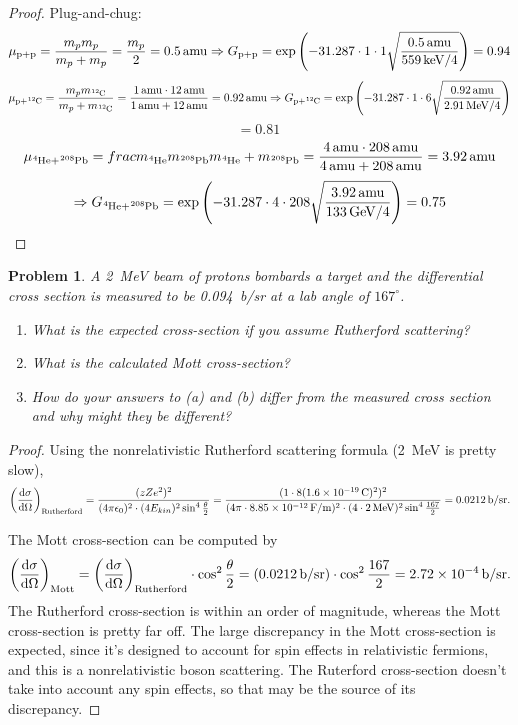 \documentclass{article}
\newtheorem{plm}{Problem}
\begin{document}
\begin{proof}
  Plug-and-chug:
  \[
    \mu_{\ce{p + p}} = \frac{m_{p}m_{p}}{m_{p} + m_{p}} = \frac{m_{p}}{2} = \SI{0.5}{amu}
    \Rightarrow G_{\ce{p + p}} = \exp\qty(-31.287 \cdot 1 \cdot 1 \sqrt{\frac{\SI{0.5}{amu}}{\SI{559}{keV} / 4}})
    = \SI{0.94}{}
  \]
  \[
    \mu_{\ce{p + ^{12}C}} = \frac{m_{p}m_{\ce{^{12}C}}}{m_{p} + m_{\ce{^{12}C}}} = \frac{\SI{1}{amu}\cdot\SI{12}{amu}}{\SI{1}{amu}+\SI{12}{amu}}
    = \SI{0.92}{amu}
    \Rightarrow G_{\ce{p + ^{12}C}} = \exp\qty(-31.287 \cdot 1 \cdot 6 \sqrt{\frac{\SI{0.92}{amu}}{\SI{2.91}{MeV} / 4}})
  \]
  \[
    = \SI{0.81}{}
  \]
  \[
    \mu_{\ce{^{4}He + ^{208}Pb}} = frac{m_{\ce{^{4}He}}m_{\ce{^{208}{Pb}}}}{m_{\ce{^{4}He}} + m_{\ce{^{208}{Pb}}}}
    = \frac{\SI{4}{amu} \cdot \SI{208}{amu}}{\SI{4}{amu} + \SI{208}{amu}} = \SI{3.92}{amu}
  \]
  \[
    \Rightarrow G_{\ce{^{4}He + ^{208}Pb}} = \exp\qty(-31.287 \cdot 4 \cdot 208 \sqrt{\frac{\SI{3.92}{amu}}{\SI{133}{GeV} / 4}})
    = \SI{0.75}{}
  \]
\end{proof}

\begin{plm}
  A \SI{2}{MeV} beam of protons bombards a  target and the differential cross section is measured to be \SI{0.094}{b/sr}
  at a lab angle of $167^{\circ}$.
  \begin{enumerate}
  \item What is the expected cross-section if you assume Rutherford scattering?
  \item What is the calculated Mott cross-section?
  \item How do your answers to (a) and (b) differ from the measured cross section and why might they be different?
  \end{enumerate}
\end{plm}

\begin{proof}
  Using the nonrelativistic Rutherford scattering formula (\SI{2}{MeV} is pretty slow),
  \[
    \qty(\dv{\sigma}{\Omega})_{\text{Rutherford}} = \frac{(zZe^{2})^{2}}{(4\pi\epsilon_{0})^{2} \cdot (4E_{kin})^{2} \sin^{4}\frac{\theta}{2}}
    = \frac{(1 \cdot 8 (\SI{1.6e-19}{C})^{2})^{2}}{(4\pi \cdot \SI{8.85e-12}{F/m})^{2} \cdot (4 \cdot \SI{2}{MeV})^{2}\sin^{4}\frac{167}{2}}
    = \SI{0.0212}{b/sr}.
  \]

  The Mott cross-section can be computed by
  \[
    \qty(\dv{\sigma}{\Omega})_{\text{Mott}} = \qty(\dv{\sigma}{\Omega})_{\text{Rutherford}} \cdot \cos^{2}\frac{\theta}{2}
    = (\SI{0.0212}{b/sr}) \cdot \cos^{2}\frac{167}{2} = \SI{2.72e-4}{b/sr}.
  \]
  The Rutherford cross-section is within an order of magnitude, whereas the Mott cross-section is pretty far off.
  The large discrepancy in the Mott cross-section is expected, since it's designed to account for spin effects in relativistic fermions,
  and this is a nonrelativistic boson scattering.
  The Ruterford cross-section doesn't take into account any spin effects, so that may be the source of its discrepancy.
\end{proof}
\end{document}
